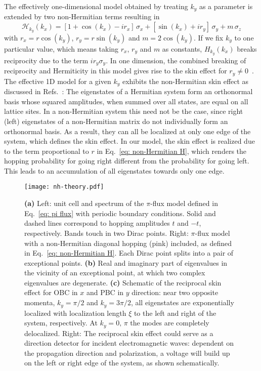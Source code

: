 The effectively one-dimensional model obtained by treating $k_y$ as a parameter is extended by two non-Hermitian terms resulting in 
\begin{equation}
\mathcal{H}_{k_y}(k_x) = \left[ 1+\cos(k_x) - i r_x \right]  \,\sigma_x + \left[ \sin(k_x) + i r_y \right] \,\sigma_y + m \, \sigma_z
\label{eq:full_non_hermitian_hamiltonian}
\end{equation}
with $r_x = r \cos(k_y)$, $r_y = r \sin(k_y)$ and $m = 2 \cos(k_y)$. If we fix $k_y$ to one particular value, which means taking $r_x$, $r_y$ and $m$ as constants, $H_{k_y}(k_x)$ breaks reciprocity due to the term $i r_y \sigma_y$. In one dimension, the combined breaking of reciprocity and Hermiticity in this model gives rise to the skin effect for $r_y\neq 0$~\cite{Shunyu2018prl,XiongBBCbreakdown2018,PhysRevB.99.201103}. The effective 1D model for a given $k_y$ exhibits the non-Hermitian skin effect as discussed in Refs.~\cite{Shunyu2018prl,song2019non}: The eigenstates of a Hermitian system form an orthonormal basis whose squared amplitudes, when summed over all states, are equal on all lattice sites. In a non-Hermitian system this need not be the case, since right (left) eigenstates of a non-Hermitian matrix do not individually form an orthonormal basis. As a result, they can all be localized at only one edge of the system, which defines the skin effect. In our model, the skin effect is realized due to the term proportional to $r$ in Eq.~\eqref{eq: non-Hermitian H}, which renders the hopping probability for going right different from the probability for going left. This leads to an accumulation of all eigenstates towards only one edge.

\begin{figure}[H]
\centering
\texttt{[image: nh-theory.pdf]}
\caption[Theory of the reciprocal skin effect]{\textbf{(a)} Left: unit cell and spectrum of the $\pi$-flux model defined in Eq.~\eqref{eq: pi flux} with periodic boundary conditions. Solid and dashed lines correspond to hopping amplitudes $t$ and $-t$, respectively. Bands touch in two Dirac points. Right: $\pi$-flux model with a non-Hermitian diagonal hopping (pink) included, as defined in Eq.~\eqref{eq: non-Hermitian H}. Each Dirac point splits into a pair of exceptional points. \textbf{(b)} Real and imaginary part of eigenvalues in the vicinity of an exceptional point, at which two complex eigenvalues are degenerate. \textbf{(c)} Schematic of the reciprocal skin effect for OBC in $x$ and PBC in $y$ direction: near two opposite momenta, $k_y= \pi /2$ and $k_y=3 \pi /2$, all eigenstates are exponentially localized with localization length $\xi$ to the left and right of the system, respectively. At $k_y=0, \, \pi$ the modes are completely delocalized. Right: The reciprocal skin effect could serve as a direction detector for incident electromagnetic waves: dependent on the propagation direction and polarization, a voltage will build up on the left or right edge of the system, as shown schematically.}
\label{fig: 1}
\end{figure}

